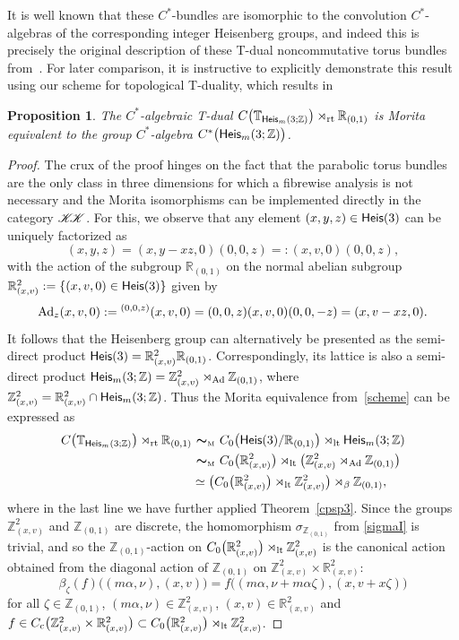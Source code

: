 \documentclass[pdftex]{sigma}
\numberwithin{equation}{section}
\def\nn{\nonumber}
\newcommand{\Z}{\zed}
\newcommand{\mbf}[1]{{\boldsymbol {#1} }}
\newcommand{\CCK}{\mathscr{K}}
\newcommand{\Heis}{{\sf Heis}}
\newcommand{\lt}{{\rm lt}}
\newcommand{\rt}{{\rm rt}}
\newcommand{\zed}{{\mathbb Z}} %
\newcommand{\real}{{\mathbb R}} %
\newcommand{\torus}{{\mathbb T}} %
\def\nn{\nonumber}
\newtheorem{Proposition}[Theorem]{Proposition}
 { \theoremstyle{definition}
\newtheorem{Definition}[Theorem]{Definition}
\newtheorem{Note}[Theorem]{Note}
\newtheorem{Example}[Theorem]{Example}
\newtheorem{Remark}[Theorem]{Remark} }
\begin{document}
It is well known that these $C^*$-bundles are isomorphic to the
convolution $C^*$-algebras of the corresponding integer Heisenberg
groups, and indeed this is precisely the original description of these T-dual
noncommutative torus bundles from~\cite{Mathai2004}. For later
comparison, it is instructive to explicitly demonstrate this result using our
scheme for topological T-duality, which results in
\begin{Proposition}\label{prop:C*Heis}
The $C^*$-algebraic T-dual
$C\big(\torus_{\Heis_m(3;\Z)}\big)\rtimes_\rt\real_{(0,1)}$ is Morita equivalent to
the group $C^*$-algebra $C^*\big(\Heis_m(3;\Z)\big)$.
\end{Proposition}
\begin{proof}
The crux of the proof hinges on the fact that the parabolic torus
bundles are the only class in three dimensions for which a fibrewise
analysis is not necessary and the Morita isomorphisms can be
implemented directly in the category $\CCK\hspace{-1mm}\CCK$.
For this, we observe that any element $(x,y,z)\in\Heis(3)$ can
be uniquely factorized as
\[
(x,y,z) = (x,y-x z,0) (0,0,z) =: (x,v,0) (0,0,z) ,
\]
with the action of the subgroup $\real_{(0,1)}$ on the normal abelian subgroup
$\real_{(x,v)}^2:=\{(x,v,0)\in\Heis(3)\}$ given by
\[
{\rm Ad}_z(x,v,0):={}^{(0,0,z)}(x,v,0) = (0,0,z) (x,v,0) (0,0,-z) = (x,v-x z,0) .
\]
It follows that the Heisenberg group can alternatively be presented as the semi-direct
product $\Heis(3) = \real_{(x,v)}^2 \real_{(0,1)}$. Correspondingly,
its lattice is also a semi-direct product
$\Heis_m(3;\Z)=\Z_{(x,v)}^2\rtimes_{{\rm Ad}}\Z_{(0,1)}$, where
$\Z_{(x,v)}^2=\real_{(x,v)}^2\cap\Heis_m(3;\Z)$. Thus the Morita
equivalence from~\eqref{scheme} can be expressed as
\begin{align}
C\big(\torus_{\Heis_m(3;\Z)}\big)\rtimes_\rt\real_{(0,1)} & \ \mbf\sim_{\text{\tiny M}} \
C_0\big(\Heis(3)/\real_{(0,1)}\big) \rtimes_\lt \Heis_m(3;\Z) \nn\\
& \ \mbf\sim_{\text{\tiny M}} \
C_0\big(\real_{(x,v)}^2\big)\rtimes_\lt \big(\Z_{(x,v)}^2\rtimes_{{\rm
 Ad}}\Z_{(0,1)} \big) \nn\\
&\simeq
\big(C_0\big(\real_{(x,v)}^2\big)\rtimes_{\lt}
\Z_{(x,v)}^2\big) \rtimes_\beta\Z_{(0,1)} ,\label{firststep}
\end{align}
where in the last line we have further applied
Theorem~\ref{cpsp3}. Since the groups $\Z_{(x,v)}^2$ and $\Z_{(0,1)}$
are discrete, the homomorphism $\sigma_{\Z_{(0,1)}}$ from \eqref{sigmaI}
is trivial, and so the $\Z _{(0,1)}$-action on $C_0\big(\real^2_{(x,v)} \big)\rtimes_{\lt} \Z_{(x,v)}^2$ is the
canonical action obtained from the diagonal action of $\Z_{(0,1)}$ on
$\Z_{(x,v)}^2\times \real_{(x,v)}^2 $:
\[
\beta_\zeta(f)\big((m \alpha,\nu) , (x,v)\big) =
f\big((m \alpha,\nu+m \alpha \zeta) , (x,v+x \zeta)\big)
\]
for
all $\zeta\in \Z_{(0,1)}$, $(m \alpha,\nu)\in\Z_{(x,v)}^2$, $(x,v)\in \real_{(x,v)}^2 $ and
$f\in C_{\rm c}\big(\Z_{(x,v)}^2\times \real_{(x,v)}^2 \big)\subset C_0\big(\real_{(x,v)}^2 \big)\rtimes_{\lt}
\Z_{(x,v)}^2$.


\end{proof}
\end{document}
